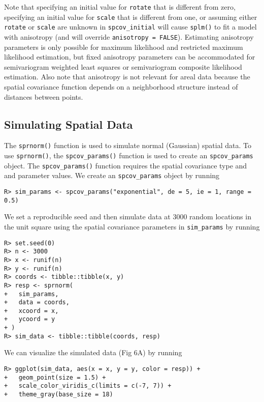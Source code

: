 \documentclass[10pt,letterpaper]{article}
\begin{document}
Note that specifying an initial value for \texttt{rotate} that is
different from zero, specifying an initial value for \texttt{scale} that
is different from one, or assuming either \texttt{rotate} or
\texttt{scale} are unknown in \texttt{spcov\_initial} will cause
\texttt{splm()} to fit a model with anisotropy (and will override
\texttt{anisotropy\ =\ FALSE}). Estimating anisotropy parameters is only
possible for maximum likelihood and restricted maximum likelihood
estimation, but fixed anisotropy parameters can be accommodated for
semivariogram weighted least squares or semivariogram composite
likelihood estimation. Also note that anisotropy is not relevant for
areal data because the spatial covariance function depends on a
neighborhood structure instead of distances between points.

\hypertarget{sec:sim_data}{%
\subsection{Simulating Spatial Data}\label{sec:sim_data}}

The \texttt{sprnorm()} function is used to simulate normal (Gaussian)
spatial data. To use \texttt{sprnorm()}, the \texttt{spcov\_params()}
function is used to create an \texttt{spcov\_params} object. The
\texttt{spcov\_params()} function requires the spatial covariance type
and and parameter values. We create an \texttt{spcov\_params} object by
running

\begin{verbatim}
R> sim_params <- spcov_params("exponential", de = 5, ie = 1, range = 0.5)
\end{verbatim}

We set a reproducible seed and then simulate data at 3000 random
locations in the unit square using the spatial covariance parameters in
\texttt{sim\_params} by running

\begin{verbatim}
R> set.seed(0)
R> n <- 3000
R> x <- runif(n)
R> y <- runif(n)
R> coords <- tibble::tibble(x, y)
R> resp <- sprnorm(
+   sim_params,
+   data = coords,
+   xcoord = x,
+   ycoord = y
+ )
R> sim_data <- tibble::tibble(coords, resp)
\end{verbatim}

We can visualize the simulated data (Fig 6A) by running

\begin{verbatim}
R> ggplot(sim_data, aes(x = x, y = y, color = resp)) +
+   geom_point(size = 1.5) +
+   scale_color_viridis_c(limits = c(-7, 7)) + 
+   theme_gray(base_size = 18)
\end{verbatim}
\end{document}
